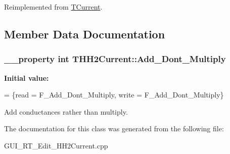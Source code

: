Reimplemented from \hyperlink{class_t_current_a00c70d232ae85a9841d8d07e5770b7bd}{T\+Current}.



\subsection{Member Data Documentation}
\hypertarget{class_t_h_h2_current_ae06a0acf968c70a18ad2b9f3a490a131}{
\subsubsection[{Add\+\_\+\+Dont\+\_\+\+Multiply}]{\setlength{\rightskip}{0pt plus 5cm}\+\_\+\+\_\+property int T\+H\+H2\+Current\+::\+Add\+\_\+\+Dont\+\_\+\+Multiply}}\label{class_t_h_h2_current_ae06a0acf968c70a18ad2b9f3a490a131}
{\bfseries Initial value\+:}
\begin{DoxyCode}
= \{read = F\_Add\_Dont\_Multiply,
                                                                    write = F\_Add\_Dont\_Multiply\}
\end{DoxyCode}


Add conductances rather than multiply. 



The documentation for this class was generated from the following file\+:\begin{DoxyCompactItemize}
\item 
G\+U\+I\+\_\+\+R\+T\+\_\+\+Edit\+\_\+\+H\+H2\+Current.\+cpp\end{DoxyCompactItemize}

